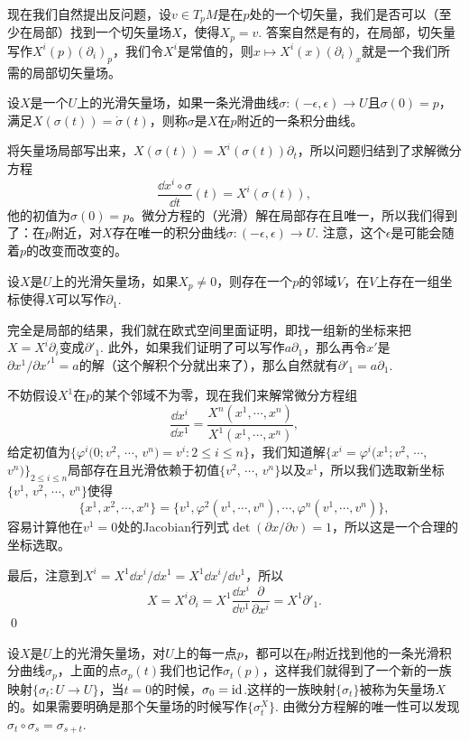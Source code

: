 现在我们自然提出反问题，设$v\in T_pM$是在$p$处的一个切矢量，我们是否可以（至少在局部）找到一个切矢量场$X$，使得$X_p=v$. 答案自然是有的，在局部，切矢量写作$X^i(p)(\partial_i)_p$，我们令$X^i$是常值的，则$x\mapsto X^i(x)(\partial_i)_x$就是一个我们所需的局部切矢量场。

\para 设$X$是一个$U$上的光滑矢量场，如果一条光滑曲线$\sigma:(-\epsilon,\epsilon)\to U$且$\sigma(0)=p$，满足$X(\sigma(t))=\dot{\sigma}(t)$，则称$\sigma$是$X$在$p$附近的一条积分曲线。

将矢量场局部写出来，$X(\sigma(t))=X^i(\sigma(t))\partial_t$，所以问题归结到了求解微分方程
\[
	\frac{\dd x^i\circ \sigma}{\dd t}(t)=X^i(\sigma(t)),
\]
他的初值为$\sigma(0)=p$。微分方程的（光滑）解在局部存在且唯一，所以我们得到了：在$p$附近，对$X$存在唯一的积分曲线$\sigma:(-\epsilon,\epsilon)\to U$. 注意，这个$\epsilon$是可能会随着$p$的改变而改变的。

\lem 设$X$是$U$上的光滑矢量场，如果$X_p\neq 0$，则存在一个$p$的邻域$V$，在$V$上存在一组坐标使得$X$可以写作$\partial_1$.

\proof
	完全是局部的结果，我们就在欧式空间里面证明，即找一组新的坐标来把$X=X^i\partial_i$变成$\partial'_1$. 此外，如果我们证明了可以写作$a \partial_1$，那么再令$x'$是$\partial x^1/\partial x'^1=a$的解（这个解积个分就出来了），那么自然就有$\partial'_1=a\partial_1$.

	不妨假设$X^1$在$p$的某个邻域不为零，现在我们来解常微分方程组
	\[
		\frac{\dd x^i}{\dd x^1}=\frac{X^n(x^1,\cdots,x^n)}{X^1(x^1,\cdots,x^n)},
	\]
	给定初值为$\{\varphi^i(0;v^2$, $\cdots$, $v^n)=v^i:2\leq i \leq n\}$，我们知道解$\{x^i=\varphi^i(x^1;v^2$, $\cdots$, $v^n)\}_{2\leq i \leq n}$局部存在且光滑依赖于初值$\{v^2$, $\cdots$, $v^n\}$以及$x^1$，所以我们选取新坐标$\{v^1$, $v^2$, $\cdots$, $v^n\}$使得
	\[
		\{x^1,x^2,\cdots,x^n\}=\{v^1,\varphi^2(v^1,\cdots,v^n),\cdots,\varphi^n(v^1,\cdots,v^n)\},
	\]
	容易计算他在$v^1=0$处的Jacobian行列式$\det(\partial x/\partial v)=1$，所以这是一个合理的坐标选取。

	最后，注意到$X^i=X^1 \dd x^i/\dd x^1=X^1 \dd x^i/\dd v^1$，所以
	\[
		X=X^i\partial_i=X^1 \frac{\dd x^i}{\dd v^1}\frac{\partial}{\partial x^i}=X^1\partial'_1.
	\]
\qed

设$X$是$U$上的光滑矢量场，对$U$上的每一点$p$，都可以在$p$附近找到他的一条光滑积分曲线$\sigma_p$，上面的点$\sigma_p(t)$我们也记作$\sigma_t(p)$，这样我们就得到了一个新的一族映射$\{\sigma_t:U\to U\}$，当$t=0$的时候，$\sigma_0=\operatorname{id}$.这样的一族映射$\{\sigma_t\}$被称为矢量场$X$的。如果需要明确是那个矢量场的时候写作$\{\sigma^X_t\}$. 由微分方程解的唯一性可以发现$\sigma_t\circ \sigma_s=\sigma_{s+t}$.

